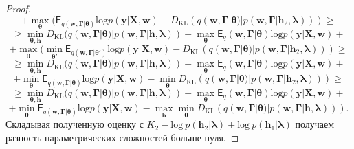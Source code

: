 \begin{proof}
\[\]
\[
+ \max_{\boldsymbol{\theta}}  (\mathsf{E}_{q(\mathbf{w}, \boldsymbol{\Gamma}|\boldsymbol{\theta})} \text{log} p(\mathbf{y}|\mathbf{X}, \mathbf{w}) - D_\text{KL}(q(\mathbf{w}, \boldsymbol{\Gamma}|\boldsymbol{\theta})|p(\mathbf{w}, \boldsymbol{\Gamma}|\mathbf{h}_2, \boldsymbol{\lambda}))) \geq
\]
\[
    \geq \min_{\boldsymbol{\theta}, \mathbf{h}} D_\text{KL}(q(\mathbf{w}, \boldsymbol{\Gamma}|\boldsymbol{\theta})|p(\mathbf{w}, \boldsymbol{\Gamma}|\mathbf{h}, \boldsymbol{\lambda})) - \max_{\boldsymbol{\theta}}\mathsf{E}_q(\mathbf{w}, \boldsymbol{\Gamma}|\boldsymbol{\theta}) \text{log} p(\mathbf{y}|\mathbf{X}, \mathbf{w}) +
\]
\[ + \max_{\boldsymbol{\theta}}  (\min_{\boldsymbol{\theta}'} \mathsf{E}_{q(\mathbf{w}, \boldsymbol{\Gamma}|\boldsymbol{\theta'})} \text{log} p(\mathbf{y}|\mathbf{X}, \mathbf{w}) - D_\text{KL}(q(\mathbf{w}, \boldsymbol{\Gamma}|\boldsymbol{\theta})|p(\mathbf{w}, \boldsymbol{\Gamma}|\mathbf{h}_2, \boldsymbol{\lambda})))  \geq
\]
\[
 \geq
\min_{\boldsymbol{\theta}, \mathbf{h}} D_\text{KL}(q(\mathbf{w}, \boldsymbol{\Gamma}|\boldsymbol{\theta})|p(\mathbf{w}, \boldsymbol{\Gamma}|\mathbf{h}, \boldsymbol{\lambda})) - \max_{\boldsymbol{\theta}}\mathsf{E}_q(\mathbf{w}, \boldsymbol{\Gamma}|\boldsymbol{\theta}) \text{log} p(\mathbf{y}|\mathbf{X}, \mathbf{w}) +
\]
\[
+ \min_{\boldsymbol{\theta}} \mathsf{E}_{q(\mathbf{w}, \boldsymbol{\Gamma}|\boldsymbol{\theta})} \text{log} p(\mathbf{y}|\mathbf{X}, \mathbf{w}) 
- \min_{\boldsymbol{\theta}} D_\text{KL}(q(\mathbf{w}, \boldsymbol{\Gamma}|\boldsymbol{\theta})|p(\mathbf{w}, \boldsymbol{\Gamma}|\mathbf{h}_2, \boldsymbol{\lambda}))) 
 \geq
\]
\[
 \geq
\min_{\boldsymbol{\theta}, \mathbf{h}} D_\text{KL}(q(\mathbf{w}, \boldsymbol{\Gamma}|\boldsymbol{\theta})|p(\mathbf{w}, \boldsymbol{\Gamma}|\mathbf{h}, \boldsymbol{\lambda})) - \max_{\boldsymbol{\theta}}\mathsf{E}_q(\mathbf{w}, \boldsymbol{\Gamma}|\boldsymbol{\theta}) \text{log} p(\mathbf{y}|\mathbf{X}, \mathbf{w}) +
\]
\[ + \min_{\boldsymbol{\theta}} \mathsf{E}_{q(\mathbf{w}, \boldsymbol{\Gamma}|\boldsymbol{\theta})} \text{log} p(\mathbf{y}|\mathbf{X}, \mathbf{w}) 
- \max_{\mathbf{h}}\min_{\boldsymbol{\theta}} D_\text{KL}(q(\mathbf{w}, \boldsymbol{\Gamma}|\boldsymbol{\theta})|p(\mathbf{w}, \boldsymbol{\Gamma}|\mathbf{h}, \boldsymbol{\lambda}))). 
\]
Складывая полученную оценку с $K_2 -\text{log}~p (\mathbf{h}_2|\boldsymbol{\lambda})+\text{log}~p (\mathbf{h}_1|\boldsymbol{\lambda})$ получаем разность параметрических сложностей больше нуля.


\end{proof}
